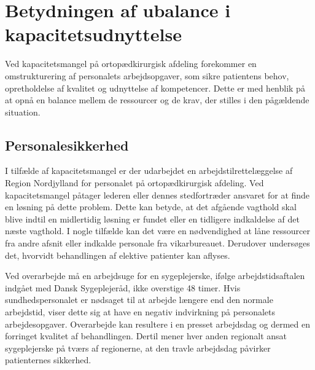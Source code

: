 \section{Betydningen af ubalance i kapacitetsudnyttelse}
Ved kapacitetsmangel på ortopædkirurgisk afdeling forekommer en omstrukturering af personalets arbejdsopgaver, som sikre patientens behov, opretholdelse af kvalitet og udnyttelse af kompetencer. Dette er med henblik på at opnå en balance mellem de ressourcer og de krav, der stilles i den pågældende situation. \cite{Bjerg2016}  %

\subsection{Personalesikkerhed} \label{Per_sik}

I tilfælde af kapacitetsmangel er der udarbejdet en arbejdstilrettelæggelse af Region Nordjylland for personalet på ortopædkirurgisk afdeling. Ved kapacitetsmangel påtager lederen eller dennes stedfortræder ansvaret for at finde en løsning på dette problem. Dette kan betyde, at det afgående vagthold skal blive indtil en midlertidig løsning er fundet eller en tidligere indkaldelse af det næste vagthold. I nogle tilfælde kan det være en nødvendighed at låne ressourcer fra andre afsnit eller indkalde personale fra vikarbureauet. Derudover undersøges det, hvorvidt behandlingen af elektive patienter kan aflyses.\cite{Bjerg2016} 

Ved overarbejde må en arbejdsuge for en sygeplejerske, ifølge arbejdstidsaftalen indgået med Dansk Sygeplejeråd, ikke overstige 48 timer\cite{Danske2015}.  Hvis sundhedspersonalet er nødsaget til at arbejde længere end den normale arbejdstid, viser dette sig at have en negativ indvirkning på personalets arbejdesopgaver.\cite{Dinges2004} Overarbejde kan resultere i en presset arbejdsdag og dermed en forringet kvalitet af behandlingen. Dertil mener hver anden regionalt ansat sygeplejerske på tværs af regionerne, at den travle arbejdsdag påvirker patienternes sikkerhed.\cite{Kjeldsen2015, Dinges2004,Aiken2002,Madsen2014} 

